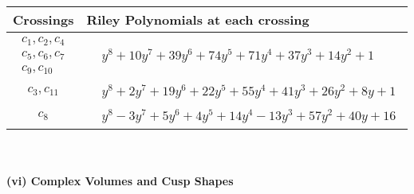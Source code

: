\documentclass[1p]{elsarticle_modified}
\theoremstyle{definition}
\begin{document}
\begin{tabular}{m{50pt}|m{274pt}}
Crossings & \hspace{64pt}Riley Polynomials at each crossing \\
\hline $$\begin{aligned}c_{1},c_{2},c_{4}\\c_{5},c_{6},c_{7}\\c_{9},c_{10}\end{aligned}$$&$\begin{aligned}
&y^8+10 y^7+39 y^6+74 y^5+71 y^4+37 y^3+14 y^2+1
\end{aligned}$\\
\hline $$\begin{aligned}c_{3},c_{11}\end{aligned}$$&$\begin{aligned}
&y^8+2 y^7+19 y^6+22 y^5+55 y^4+41 y^3+26 y^2+8 y+1
\end{aligned}$\\
\hline $$\begin{aligned}c_{8}\end{aligned}$$&$\begin{aligned}
&y^8-3 y^7+5 y^6+4 y^5+14 y^4-13 y^3+57 y^2+40 y+16
\end{aligned}$\\
\hline
\end{tabular}\\~\\
\newpage\flushleft \textbf{(vi) Complex Volumes and Cusp Shapes}
\end{document}

